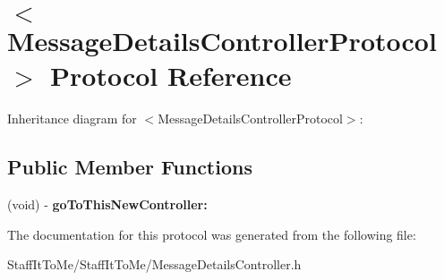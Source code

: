 \hypertarget{protocol_message_details_controller_protocol-p}{
\section{$<$\-Message\-Details\-Controller\-Protocol$>$ \-Protocol \-Reference}
\label{protocol_message_details_controller_protocol-p}
}


\-Inheritance diagram for $<$\-Message\-Details\-Controller\-Protocol$>$\-:
\subsection*{\-Public \-Member \-Functions}
\begin{DoxyCompactItemize}
\item 
\hypertarget{protocol_message_details_controller_protocol-p_aabf4969c5bb34859737b5cd1beae0696}{
(void) -\/ {\bfseries go\-To\-This\-New\-Controller\-:}}
\label{protocol_message_details_controller_protocol-p_aabf4969c5bb34859737b5cd1beae0696}

\end{DoxyCompactItemize}


\-The documentation for this protocol was generated from the following file\-:\begin{DoxyCompactItemize}
\item 
\-Staff\-It\-To\-Me/\-Staff\-It\-To\-Me/\-Message\-Details\-Controller.\-h\end{DoxyCompactItemize}

